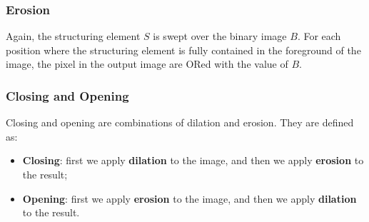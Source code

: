 \subsubsection*{Erosion}
Again, the structuring element $S$ is swept over the binary image $B$. For each position where the structuring element
is fully contained in the foreground of the image, the pixel in the output image are ORed with the value of $B$.

\subsubsection*{Closing and Opening}
Closing and opening are combinations of dilation and erosion. They are defined as:
\begin{itemize}
    \item \textbf{Closing}: first we apply \textbf{dilation} to the image, and then we apply \textbf{erosion} to the result;
    \item \textbf{Opening}: first we apply \textbf{erosion} to the image, and then we apply \textbf{dilation} to the result.
\end{itemize}